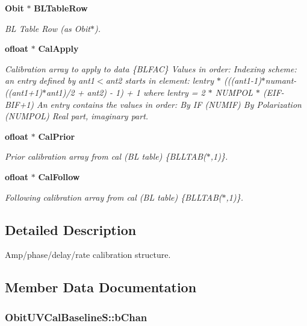 \begin{CompactItemize}
{\bf Obit} $\ast$ {\bf BLTable\-Row}
\begin{CompactList}\small\item\em BL Table Row (as Obit$\ast$). \item\end{CompactList}\item 
{\bf ofloat} $\ast$ {\bf Cal\-Apply}
\begin{CompactList}\small\item\em Calibration array to apply to data \{BLFAC\} Values in order: Indexing scheme: an entry defined by ant1$<$ant2 starts in element: lentry $\ast$ (((ant1-1)$\ast$numant-((ant1+1)$\ast$ant1)/2 + ant2) - 1) + 1 where lentry = 2 $\ast$ NUMPOL $\ast$ (EIF-BIF+1) An entry contains the values in order: By IF (NUMIF) By Polarization (NUMPOL) Real part, imaginary part. \item\end{CompactList}\item 
{\bf ofloat} $\ast$ {\bf Cal\-Prior}
\begin{CompactList}\small\item\em Prior calibration array from cal (BL table) \{BLLTAB($\ast$,1)\}. \item\end{CompactList}\item 
{\bf ofloat} $\ast$ {\bf Cal\-Follow}
\begin{CompactList}\small\item\em Following calibration array from cal (BL table) \{BLLTAB($\ast$,1)\}. \item\end{CompactList}\end{CompactItemize}


\subsection{Detailed Description}
Amp/phase/delay/rate calibration structure. 



\subsection{Member Data Documentation}
\subsubsection{ {\bf Obit\-UVCal\-Baseline\-S::b\-Chan}}\label{structObitUVCalBaselineS_o13}


